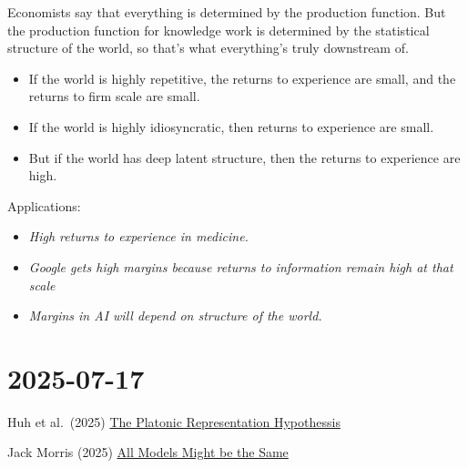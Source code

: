 \documentclass[
  10pt,
  letterpaper,
  DIV=11,
  numbers=noendperiod,
  oneside]{scrartcl}
\providecommand{\tightlist}{%
  \setlength{\itemsep}{0pt}\setlength{\parskip}{0pt}}\usepackage{longtable,booktabs,array}
\begin{document}
\begin{description}
\tightlist
\item[Everything is downstream of the statistical structure of the
world.]
Economists say that everything is determined by the production function.
But the production function for knowledge work is determined by the
statistical structure of the world, so that's what everything's truly
downstream of.

\begin{itemize}
\tightlist
\item
  If the world is highly repetitive, the returns to experience are
  small, and the returns to firm scale are small.
\end{itemize}

\begin{itemize}
\tightlist
\item
  If the world is highly idiosyncratic, then returns to experience are
  small.
\end{itemize}

\begin{itemize}
\tightlist
\item
  But if the world has deep latent structure, then the returns to
  experience are high.
\end{itemize}

Applications:

\begin{itemize}
\tightlist
\item
  \emph{High returns to experience in medicine.}
\end{itemize}

\begin{itemize}
\tightlist
\item
  \emph{Google gets high margins because returns to information remain
  high at that scale}
\end{itemize}

\begin{itemize}
\tightlist
\item
  \emph{Margins in AI will depend on structure of the world.}
\end{itemize}
\end{description}

\section{2025-07-17 \textbar{}}\label{section}

Huh et al.~(2025) \href{https://arxiv.org/abs/2405.07987}{The Platonic
Representation Hypothessis}

Jack Morris (2025)
\href{https://blog.jxmo.io/p/there-is-only-one-model}{All Models Might
be the Same}
\end{document}
